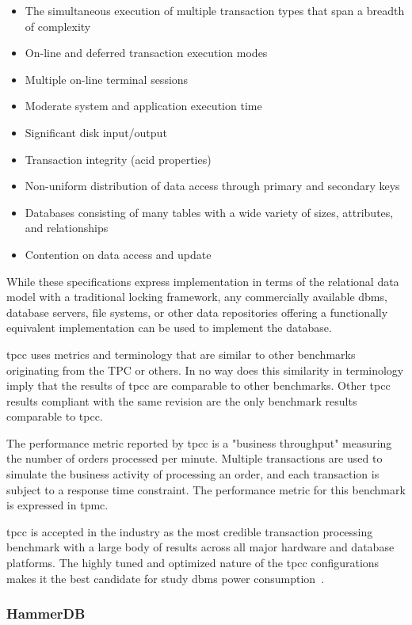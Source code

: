 \begin{itemize}
    \item The simultaneous execution of multiple transaction types that span a breadth of complexity
    \item On-line and deferred transaction execution modes
    \item Multiple on-line terminal sessions
    \item Moderate system and application execution time
    \item Significant disk input/output
    \item Transaction integrity (\gls{acid} properties)
    \item Non-uniform distribution of data access through primary and secondary keys
    \item Databases consisting of many tables with a wide variety of sizes, attributes, and relationships
    \item Contention on data access and update
\end{itemize}

While these specifications express implementation in terms of the relational data model with a traditional locking framework, any commercially available \gls{dbms}, database servers, file systems, or other data repositories offering a functionally equivalent implementation can be used to implement the database.

\gls{tpcc} uses metrics and terminology that are similar to other benchmarks originating from the TPC or others. In no way does this similarity in terminology imply that the results of \gls{tpcc} are comparable to other benchmarks. Other \gls{tpcc} results compliant with the same revision are the only benchmark results comparable to \gls{tpcc}.

The performance metric reported by \gls{tpcc} is a "business throughput" measuring the number of orders processed per minute. Multiple transactions are used to simulate the business activity of processing an order, and each transaction is subject to a response time constraint. The performance metric for this benchmark is expressed in \gls{tpmc}. 

\gls{tpcc} is accepted in the industry as the most credible transaction processing benchmark with a large body of results across all major hardware and database platforms. The highly tuned and optimized nature of the \gls{tpcc} configurations makes it the best candidate for study \gls{dbms} power consumption~\cite{powerconsumptiontppc}.

\subsubsection{HammerDB}


